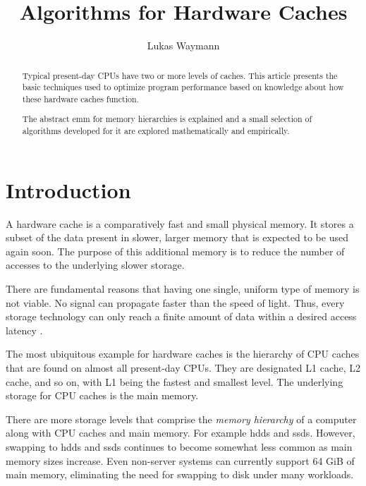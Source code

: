 \documentclass[a4paper]{scrartcl}
\title{Algorithms for Hardware Caches}
\author{Lukas Waymann}
\newcommand{\article}{article} %
\begin{document}
\maketitle
\newpage

\begin{abstract}
   Typical present-day CPUs have two or more levels of caches.  This \article{} presents
   the basic techniques used to optimize program performance based on knowledge about how
   these hardware caches function.

   The abstract \gls{emm} for memory hierarchies is explained and a small selection of
   algorithms developed for it
   are explored mathematically and empirically.
\end{abstract}
\newpage

\tableofcontents
\newpage

\glsresetall %

\section{Introduction}

A hardware cache is a comparatively
fast and small physical memory.  It stores a subset of the data present in slower, larger
memory that is expected to be used again soon.  The purpose of this additional memory is
to reduce the number of accesses to the underlying slower storage.

There are fundamental reasons that having one single, uniform
type of memory is not viable.  No signal can propagate faster than the speed of light.
Thus, every storage technology can only reach a finite amount of data within a desired
access latency \cite[p.~2]{afmh}.

The most ubiquitous example for hardware caches is the hierarchy of
CPU caches that are found on almost all present-day CPUs.  They are designated L1 cache,
L2 cache, and so on, with L1 being the fastest and smallest level.  The underlying storage
for CPU caches is the main memory.

There are more storage levels that comprise
the \emph{memory hierarchy} of a computer along with CPU caches and main memory.  For
example \glspl{hdd} and \glspl{ssd}. %
However, swapping to \glspl{hdd} and \glspl{ssd} continues to become somewhat less common
as main memory sizes increase.  Even non-server systems can currently support 64 GiB of
main memory, eliminating the need for swapping to disk under many workloads.
\end{document}

